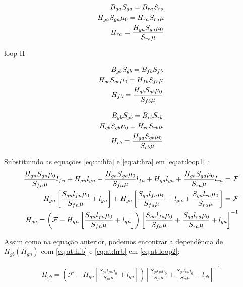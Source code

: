 \begin{align}
	B_{ga} S_{ga} = B_{ra} S_{ra} \notag \\
		H_{ga} S_{ga} \mu_0 = H_{ra} S_{ra} \mu \notag \\
		H_{ra} = \frac{H_{ga} S_{ga} \mu_0}{S_{ra} \mu} \label{eq:at:hra}
\end{align}

 loop II

\begin{align}
	B_{gb} S_{gb} = B_{fb} S_{fb} \notag \\
		H_{gb} S_{gb} \mu_0 = H_{fb} S_{fb} \mu \notag \\
		H_{fb} = \frac{H_{gb} S_{gb} \mu_0}{S_{fb} \mu} \label{eq:at:hfb}
\end{align}

\begin{align}
	B_{gb} S_{gb} = B_{rb} S_{rb} \notag \\
		H_{gb} S_{gb} \mu_0 = H_{rb} S_{rb} \mu \notag \\
		H_{rb} = \frac{H_{ga} S_{gb} \mu_0}{S_{rb} \mu} \label{eq:at:hrb}
\end{align}

Substituindo as equações \eqref{eq:at:hfa} e \eqref{eq:at:hra} em \eqref{eq:at:loop1} :
\begin{align}
	\frac{H_{gn} S_{gn} \mu_0}{S_{fn} \mu} l_{fn} + 
	H_{gn} l_{gn} + 
	\frac{H_{ga} S_{ga} \mu_0}{S_{fa} \mu} l_{fa} + 
	H_{ga} l_{ga} + 
	\frac{H_{ga} S_{ga} \mu_0}{S_{ra} \mu} l_{ra} 
	= 
	\mathcal{F} \notag
	\\  %
	H_{gn} \left[
				\frac{S_{gn} l_{fn} \mu_0}{S_{fn} \mu}  + l_{gn}
		   \right] +
    H_{ga} \left[ 
		    	\frac{S_{ga} l_{fa} \mu_0}{S_{fa} \mu}  + 
		    	l_{ga} + 
		    	\frac{S_{ga} l_{ra} \mu_0}{S_{ra} \mu} 
   		   \right]
 	= 
 	\mathcal{F} \notag
 	\\ %
 	H_{ga} 
 	=  
 	\left(
	 	\mathcal{F} -
	 	H_{gn} \left[
	 				\frac{S_{gn} l_{fn} \mu_0}{S_{fn} \mu}  + l_{gn}
	 			\right] 
 	\right)
 	\left[ 
 		   	\frac{S_{ga} l_{fa} \mu_0}{S_{fa} \mu}  +  
 		   	\frac{S_{ga} l_{ra} \mu_0}{S_{ra} \mu}  +
 		   	l_{ga} 
 	\right]^{-1} \label{eq:at:H_ga(H_gn)}
\end{align}

Assim como na equação anterior, podemos encontrar a dependência de $H_{gb}(H_{gn})$ com \eqref{eq:at:hfb} e \eqref{eq:at:hrb} em \eqref{eq:at:loop2}:

\begin{align}
	H_{gb} 
 	=  
 	\left(
	 	\mathcal{F} -
	 	H_{gn} \left[
	 				\frac{S_{gn} l_{fn} \mu_0}{S_{fn} \mu}  + l_{gn}
	 			\right] 
 	\right)
 	\left[ 
 		   	\frac{S_{gb} l_{fb} \mu_0}{S_{fb} \mu}  + 
 		   	\frac{S_{gb} l_{rb} \mu_0}{S_{rb} \mu} +
 		   	l_{gb}
 	\right]^{-1} \label{eq:at:H_gb(H_gn)}
\end{align}

